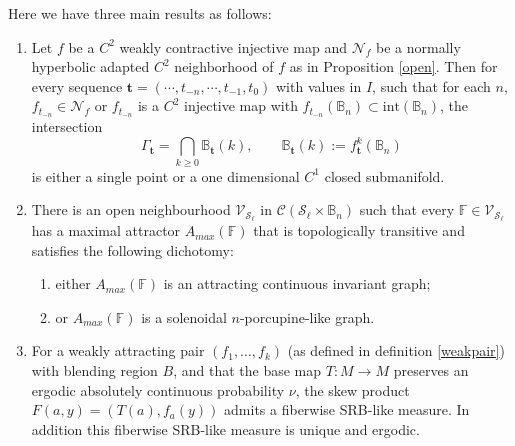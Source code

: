 \documentclass[11pt,reqno]{amsart}
\theoremstyle{plain}
\newtheorem*{theorem A}{Theorem A}
\newtheorem*{theorem B}{Theorem B}
\newtheorem*{theorem C}{Theorem C}
\newtheorem*{theorem 1}{Theorem 1}
\newtheorem*{theorem 2}{Theorem 2}
\newtheorem*{theorem 3}{Theorem 3}
\numberwithin{equation}{section}
\begin{document}
Here we have three main results as follows:
\begin{enumerate}
\item [$\blacktriangleright$] Let $f$ be a $C^2$ weakly contractive injective map and $\mathcal{N}_f$ be a normally hyperbolic adapted $C^2$ neighborhood of $f$ as in Proposition \ref{open}.
Then for every sequence $\mathbf{t}=(\cdots, t_{-n}, \cdots, t_{-1}, t_0)$
  with values in $I$, such that for each $n$, $f_{t_{-n}} \in \mathcal{N}_f$ or $f_{t_{-n}}$ is a $C^2$ injective map with $f_{t_{-n}}(\mathbb{B}_n)\subset \text{int}(\mathbb{B}_n)$,
   the intersection
  \begin{equation*}
\Gamma_{\mathbf{t}}=    \bigcap_{k\ge 0}
    \mathbb{B}_{\mathbf{t}} (k),
    \qquad
    \mathbb{B}_{\mathbf{t}} (k) :=       f^k_{\mathbf{t}} (\mathbb{B}_{n})
      \end{equation*}
is either a single point or a one dimensional $C^1$ closed submanifold.


\item [$\blacktriangleright$] There is an open neighbourhood
 $ \mathcal{V}_{\mathcal{S}_\ell}$ in
 $\mathcal{C}(\mathcal{S}_\ell \times \mathbb{B}_n)$
such that every $\mathbb{F}\in \mathcal{V}_{\mathcal{S}_\ell}$ has a maximal attractor $A_{max}(\mathbb{F})$ that
is  topologically transitive and satisfies the following dichotomy:
 \begin{enumerate}
   \item [$-$] either $A_{max}(\mathbb{F})$ is an attracting continuous invariant graph;
   \item [$-$] or $A_{max}(\mathbb{F})$ is a solenoidal $n$-porcupine-like graph.
      \end{enumerate}

\item [$\blacktriangleright$] For a weakly attracting pair $(f_1,\ldots,f_k)$  (as defined in definition \ref{weakpair}) with blending 
region $B$, and that the base map $T\colon M\to M$ preserves an ergodic
absolutely continuous probability $\nu$,  the skew product
$F(a,y)=(T(a),f_a(y))$ admits a fiberwise SRB-like measure. In addition this fiberwise SRB-like measure is unique and ergodic.
\end{enumerate}
\end{document}
